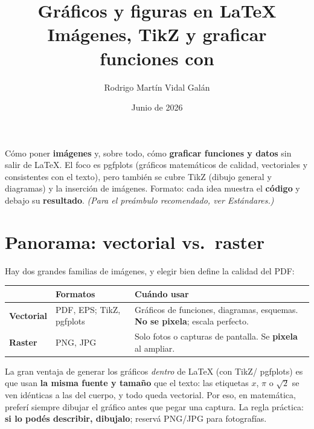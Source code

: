 \documentclass[11pt,a4paper]{article}
\title{\textbf{Gráficos y figuras en \LaTeX}\\[2pt]
       \large Imágenes, TikZ y graficar funciones con \pkg{pgfplots}}
\author{Rodrigo Martín Vidal Galán}
\date{Junio de 2026}
\newcommand{\pkg}[1]{\textsf{#1}}
\begin{document}
\maketitle

\noindent Cómo poner \textbf{imágenes} y, sobre todo, cómo \textbf{graficar
funciones y datos} sin salir de \LaTeX. El foco es \pkg{pgfplots} (gráficos
matemáticos de calidad, vectoriales y consistentes con el texto), pero también
se cubre \pkg{TikZ} (dibujo general y diagramas) y la inserción de imágenes.
Formato: cada idea muestra el \textbf{código} y debajo su \textbf{resultado}.
\emph{(Para el preámbulo recomendado, ver \emph{Estándares}.)}

\newpage
\tableofcontents
\newpage

\section{Panorama: vectorial vs.\ raster}
Hay dos grandes familias de imágenes, y elegir bien define la calidad del PDF:
\begin{center}\small
\renewcommand{\arraystretch}{1.3}
\begin{tabularx}{\linewidth}{@{}l l X@{}}
\toprule
 & \textbf{Formatos} & \textbf{Cuándo usar} \\
\midrule
\textbf{Vectorial} & PDF, EPS; TikZ, \pkg{pgfplots} & Gráficos de funciones, diagramas, esquemas. \textbf{No se pixela}; escala perfecto. \\
\textbf{Raster} & PNG, JPG & Solo fotos o capturas de pantalla. Se \textbf{pixela} al ampliar. \\
\bottomrule
\end{tabularx}
\end{center}
La gran ventaja de generar los gráficos \emph{dentro} de \LaTeX{} (con TikZ/
\pkg{pgfplots}) es que usan \textbf{la misma fuente y tamaño} que el texto: las
etiquetas $x$, $\pi$ o $\sqrt{2}$ se ven idénticas a las del cuerpo, y todo queda
vectorial. Por eso, en matemática, preferí siempre dibujar el gráfico antes que
pegar una captura. La regla práctica: \textbf{si lo podés describir, dibujalo};
reservá PNG/JPG para fotografías.

\end{document}
